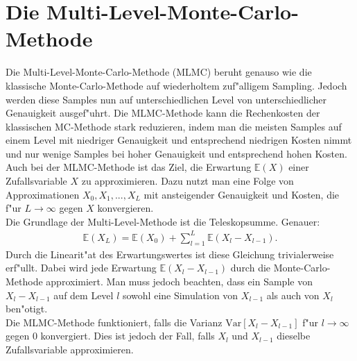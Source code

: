 \section{Die Multi-Level-Monte-Carlo-Methode}
Die Multi-Level-Monte-Carlo-Methode (MLMC) beruht genauso wie die klassische Monte-Carlo-Methode auf wiederholtem zuf"alligem Sampling. Jedoch werden diese Samples nun auf unterschiedlichen Level von unterschiedlicher Genauigkeit ausgef"uhrt.
Die MLMC-Methode kann die Rechenkosten der klassischen MC-Methode stark reduzieren, indem man die meisten Samples auf einem Level mit niedriger Genauigkeit und entsprechend niedrigen Kosten nimmt und nur wenige Samples bei hoher Genauigkeit und entsprechend hohen Kosten.\\
Auch bei der MLMC-Methode ist das Ziel, die Erwartung $\mathbb{E}(X)$ einer Zufallsvariable $X$ zu approximieren. Dazu nutzt man  eine Folge von Approximationen $X_0,X_1,...,X_L$ mit ansteigender Genauigkeit und Kosten, die f"ur $L\longrightarrow\infty$ gegen $X$ konvergieren.\\
Die Grundlage der Multi-Level-Methode ist die Teleskopsumme. Genauer:
\begin{align*}
\mathbb{E}(X_L)=\mathbb{E}(X_0)+\sum_{l=1}^L \mathbb{E}(X_l-X_{l-1}).
\end{align*}
Durch die Linearit"at des Erwartungswertes ist diese Gleichung trivialerweise erf"ullt. Dabei wird jede Erwartung $\mathbb{E}(X_l-X_{l-1})$ durch die Monte-Carlo-Methode approximiert. Man muss jedoch beachten, dass ein Sample von $X_l-X_{l-1}$ auf dem Level $l$ sowohl eine Simulation von $X_{l-1}$ als auch von $X_l$ ben"otigt.\\
Die MLMC-Methode funktioniert, falls die Varianz $\text{Var}[X_l-X_{l-1}]$ f"ur $l\rightarrow\infty$ gegen $0$ konvergiert. Dies ist jedoch der Fall, falls $X_l$ und $X_{l-1}$ dieselbe Zufallsvariable approximieren.\vspace{1cm}

